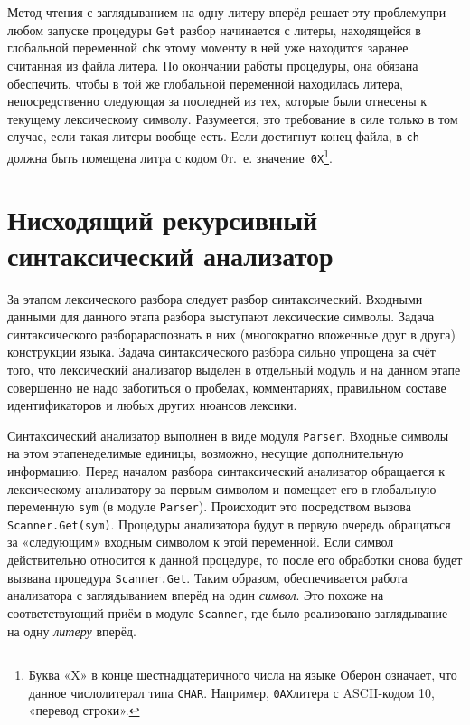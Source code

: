\documentclass[utf8]{lgu}
\newcommand{\tire}{\unskip\nobreak\thinspace\textemdash\thinspace}
\newcommand{\code}[1]{{\normalsize\texttt{#1}}}
\newcommand{\codef}[1]{{\scriptsize\texttt{#1}}}
\begin{document}
Метод чтения с заглядыванием на одну литеру вперёд решает эту проблему\tire при любом запуске процедуры \code{Get} разбор начинается с литеры, находящейся в глобальной переменной \code{ch}\tire к этому моменту в ней уже находится заранее считанная из файла литера. По окончании работы процедуры, она обязана обеспечить, чтобы в той же глобальной переменной находилась литера, непосредственно следующая за последней из тех, которые были отнесены к текущему лексическому символу. Разумеется, это требование в силе только в том случае, если такая литеры вообще есть. Если достигнут конец файла, в \code{ch} должна быть помещена литра с кодом 0\tire т.~е. значение~\code{0X}\footnote{Буква «X» в конце шестнадцатеричного числа на языке Оберон означает, что данное число\tire литерал типа \codef{CHAR}. Например, \codef{0AX}\tire литера с ASCII-кодом 10, «перевод строки».}.

\section{Нисходящий рекурсивный синтаксический анализатор}

\firstparskip За этапом лексического разбора следует разбор синтаксический. Входными данными для данного этапа разбора выступают лексические символы. Задача синтаксического разбора\tire распознать в них (многократно вложенные друг в друга) конструкции языка. Задача синтаксического разбора сильно упрощена за счёт того, что лексический анализатор выделен в отдельный модуль и на данном этапе совершенно не надо заботиться о пробелах, комментариях, правильном составе идентификаторов и любых других нюансов лексики.

Синтаксический анализатор выполнен в виде модуля \code{Parser}. Входные символы на этом этапе\tire неделимые единицы, возможно, несущие дополнительную информацию. Перед началом разбора синтаксический анализатор обращается к лексическому анализатору за первым символом и помещает его в глобальную переменную \code{sym} (в модуле \code{Parser}). Происходит это посредством вызова \code{Scanner.Get(sym)}. Процедуры анализатора будут в первую очередь обращаться за «следующим» входным символом к этой переменной. Если символ действительно относится к данной процедуре, то после его обработки снова будет вызвана процедура \code{Scanner.Get}. Таким образом, обеспечивается работа анализатора с заглядыванием вперёд на один \textit{символ}. Это похоже на соответствующий приём в модуле \code{Scanner}, где было реализовано заглядывание на одну \textit{литеру} вперёд.
\end{document}
